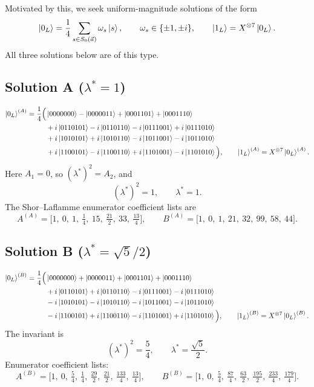 \documentclass[11pt]{article}
\begin{document}
Motivated by this, we seek uniform-magnitude solutions of the form
\[
\ket{0_L}=\frac{1}{4}\sum_{s\in S_0(\vec a)}\omega_s\ket{s},
\qquad \omega_s\in\{\pm 1,\pm i\},
\qquad \ket{1_L}=X^{\otimes 7}\ket{0_L}.
\]
All three solutions below are of this type.

\subsection{Solution A (\texorpdfstring{$\lambda^\ast=1$}{lambda*=1})}
\[
\begin{aligned}
\ket{0_L}^{(A)}=\frac{1}{4}\Big(
&\ket{0000000}-\ket{0000011}+\ket{0001101}+\ket{0001110}\\
&+i\ket{0110101}-i\ket{0110110}-i\ket{0111001}+i\ket{0111010}\\
&+i\ket{1010101}+i\ket{1010110}-i\ket{1011001}-i\ket{1011010}\\
&+i\ket{1100101}-i\ket{1100110}+i\ket{1101001}-i\ket{1101010}
\Big),
\qquad
\ket{1_L}^{(A)}=X^{\otimes 7}\ket{0_L}^{(A)}.
\end{aligned}
\]
Here \(A_1=0\), so \((\lambda^\ast)^2=A_2\), and
\[
(\lambda^\ast)^2=1,\qquad \lambda^\ast=1.
\]
The Shor--Laflamme enumerator coefficient lists are
\[
A^{(A)}=\Big[1,\ 0,\ 1,\ \tfrac14,\ 15,\ \tfrac{21}{2},\ 33,\ \tfrac{13}{4}\Big],
\qquad
B^{(A)}=\Big[1,\ 0,\ 1,\ 21,\ 32,\ 99,\ 58,\ 44\Big].
\]

\subsection{Solution B (\texorpdfstring{$\lambda^\ast=\sqrt{5}/2$}{lambda*=sqrt(5)/2})}
\[
\begin{aligned}
\ket{0_L}^{(B)}=\frac{1}{4}\Big(
&\ket{0000000}+\ket{0000011}+\ket{0001101}+\ket{0001110}\\
&+i\ket{0110101}+i\ket{0110110}-i\ket{0111001}-i\ket{0111010}\\
&-i\ket{1010101}-i\ket{1010110}-i\ket{1011001}-i\ket{1011010}\\
&-i\ket{1100101}+i\ket{1100110}-i\ket{1101001}+i\ket{1101010}
\Big),
\qquad
\ket{1_L}^{(B)}=X^{\otimes 7}\ket{0_L}^{(B)}.
\end{aligned}
\]
The invariant is
\[
(\lambda^\ast)^2=\frac{5}{4},\qquad \lambda^\ast=\frac{\sqrt5}{2}.
\]
Enumerator coefficient lists:
\[
A^{(B)}=\Big[1,\ 0,\ \tfrac54,\ \tfrac14,\ \tfrac{29}{2},\ \tfrac{21}{2},\ \tfrac{133}{4},\ \tfrac{13}{4}\Big],
\qquad
B^{(B)}=\Big[1,\ 0,\ \tfrac54,\ \tfrac{87}{4},\ \tfrac{63}{2},\ \tfrac{195}{2},\ \tfrac{233}{4},\ \tfrac{179}{4}\Big].
\]
\end{document}

